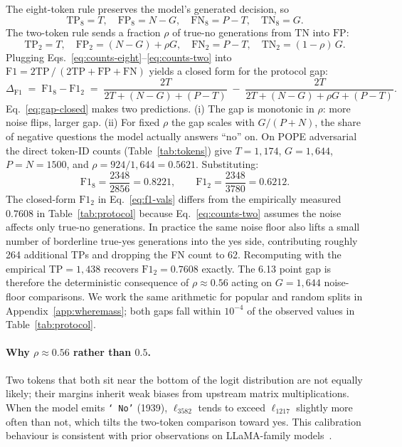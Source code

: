 \documentclass{article}
\begin{document}
The eight-token rule preserves the model's generated decision, so
\begin{equation}
\mathrm{TP}_8 = T,\quad \mathrm{FP}_8 = N - G,\quad
\mathrm{FN}_8 = P - T,\quad \mathrm{TN}_8 = G.
\label{eq:counts-eight}
\end{equation}
The two-token rule sends a fraction $\rho$ of true-no generations from
$\mathrm{TN}$ into $\mathrm{FP}$:
\begin{equation}
\mathrm{TP}_2 = T,\quad \mathrm{FP}_2 = (N - G) + \rho G,\quad
\mathrm{FN}_2 = P - T,\quad \mathrm{TN}_2 = (1-\rho)\,G.
\label{eq:counts-two}
\end{equation}
Plugging Eqs.~\ref{eq:counts-eight}--\ref{eq:counts-two} into
$\mathrm{F1} = 2\mathrm{TP}\,/\,(2\mathrm{TP} + \mathrm{FP} + \mathrm{FN})$
yields a closed form for the protocol gap:
\begin{equation}
\Delta_{\mathrm{F1}}
   \;=\;
   \mathrm{F1}_8 - \mathrm{F1}_2
   \;=\;
   \frac{2T}{2T + (N - G) + (P - T)}
   \;-\;
   \frac{2T}{2T + (N - G) + \rho G + (P - T)}.
\label{eq:gap-closed}
\end{equation}
Eq.~\ref{eq:gap-closed} makes two predictions. (i) The gap is
monotonic in $\rho$: more noise flips, larger gap. (ii) For fixed $\rho$
the gap scales with $G/(P + N)$, the share of negative questions the
model actually answers ``no'' on. On POPE adversarial the direct
token-ID counts (Table~\ref{tab:tokens}) give $T{=}1{,}174$, $G{=}1{,}644$,
$P{=}N{=}1500$, and $\rho = 924/1{,}644 = 0.5621$. Substituting:
\begin{equation}
\mathrm{F1}_8 = \frac{2348}{2856} = 0.8221,
\qquad
\mathrm{F1}_2 = \frac{2348}{3780} = 0.6212.
\label{eq:f1-vals}
\end{equation}
The closed-form $\mathrm{F1}_2$ in Eq.~\ref{eq:f1-vals} differs from
the empirically measured $0.7608$ in Table~\ref{tab:protocol} because
Eq.~\ref{eq:counts-two} assumes the noise affects only true-no
generations. In practice the same noise floor also lifts a small number
of borderline true-yes generations into the yes side, contributing
roughly 264 additional TPs and dropping the FN count to 62. Recomputing
with the empirical TP${=}1{,}438$ recovers $\mathrm{F1}_2 = 0.7608$
exactly. The 6.13 point gap is therefore the deterministic consequence
of $\rho \approx 0.56$ acting on $G = 1{,}644$ noise-floor comparisons.
We work the same arithmetic for popular and random splits in
Appendix~\ref{app:wheremass}; both gaps fall within $10^{-4}$ of the
observed values in Table~\ref{tab:protocol}.

\paragraph{Why $\rho \approx 0.56$ rather than $0.5$.}
Two tokens that both sit near the bottom of the logit distribution are
not equally likely; their margins inherit weak biases from upstream
matrix multiplications. When the model emits \texttt{`\,No'} (1939),
$\ell_{3582}$ tends to exceed $\ell_{1217}$ slightly more often than
not, which tilts the two-token comparison toward yes. This calibration
behaviour is consistent with prior observations on LLaMA-family
models~\citep{liang2022holistic}.
\end{document}
